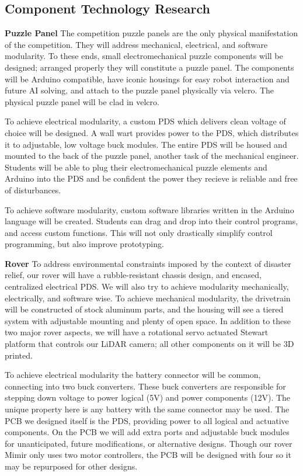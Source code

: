 \documentclass[a4paper, 10pt]{article}
\begin{document}
 	\subsection{Component Technology Research}
 	\textbf{Puzzle Panel}
 	The competition puzzle panels are the only physical manifestation of the competition. They will address mechanical, electrical, and software modularity. To these ends, small electromechanical puzzle components will be designed; arranged properly they will constitute a puzzle panel. The components will be Arduino compatible, have iconic housings for easy robot interaction and future AI solving, and attach to the puzzle panel physically via velcro. The physical puzzle panel will be clad in velcro. 
 	
 	To achieve electrical modularity, a custom PDS which delivers clean voltage of choice will be designed. A wall wart provides power to the PDS, which distributes it to adjustable, low voltage buck modules. The entire PDS will be housed and mounted to the back of the puzzle panel, another task of the mechanical engineer. Students will be able to plug their electromechanical puzzle elements and Arduino into the PDS and be confident the power they recieve is reliable and free of disturbances.
 	
 	To achieve software modularity, custom software libraries written in the Arduino language will be created. Students can drag and drop into their control programs, and access custom functions. This will not only drastically simplify control programming, but also improve prototyping.
 	
 	\textbf{Rover}
 	To address environmental constraints imposed by the context of disaster relief, our rover will have a rubble-resistant chassis design, and encased, centralized electrical PDS. We will also try to achieve modularity mechanically, electrically, and software wise. To achieve mechanical modularity, the drivetrain will be constructed of stock aluminum parts, and the housing will see a tiered system with adjustable mounting and plenty of open space. In addition to these two major rover aspects, we will have a rotational servo actuated Stewart platform that controls our LiDAR camera; all other components on it will be 3D printed.
 	
 	To achieve electrical modularity the battery connector will be common, connecting into two buck converters. These buck converters are responsible for stepping down voltage to power logical (5V) and power components (12V). The unique property here is any battery with the same connector may be used. The PCB we designed itself is the PDS, providing power to all logical and actuative components. On the PCB we will add extra ports and adjustable buck modules for unanticipated, future modifications, or alternative designs. Though our rover Mimir only uses two motor controllers, the PCB will be designed with four so it may be repurposed for other designs.
 	
\end{document}
